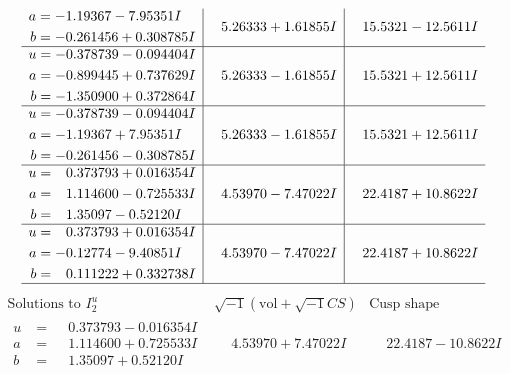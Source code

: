 \documentclass[1p]{elsarticle_modified}
\theoremstyle{definition}
\newcommand{\I}{\sqrt{-1}}
\begin{document}
$$\begin{array}{c|c|c}
\begin{aligned}
a &= -1.19367 - 7.95351 I \\
b &= -0.261456 + 0.308785 I\end{aligned}
 & \phantom{-}5.26333 + 1.61855 I & \phantom{-}15.5321 - 12.5611 I \\ \hline\begin{aligned}
u &= -0.378739 - 0.094404 I \\
a &= -0.899445 + 0.737629 I \\
b &= -1.350900 + 0.372864 I\end{aligned}
 & \phantom{-}5.26333 - 1.61855 I & \phantom{-}15.5321 + 12.5611 I \\ \hline\begin{aligned}
u &= -0.378739 - 0.094404 I \\
a &= -1.19367 + 7.95351 I \\
b &= -0.261456 - 0.308785 I\end{aligned}
 & \phantom{-}5.26333 - 1.61855 I & \phantom{-}15.5321 + 12.5611 I \\ \hline\begin{aligned}
u &= \phantom{-}0.373793 + 0.016354 I \\
a &= \phantom{-}1.114600 - 0.725533 I \\
b &= \phantom{-}1.35097 - 0.52120 I\end{aligned}
 & \phantom{-}4.53970 - 7.47022 I & \phantom{-}22.4187 + 10.8622 I \\ \hline\begin{aligned}
u &= \phantom{-}0.373793 + 0.016354 I \\
a &= -0.12774 - 9.40851 I \\
b &= \phantom{-}0.111222 + 0.332738 I\end{aligned}
 & \phantom{-}4.53970 - 7.47022 I & \phantom{-}22.4187 + 10.8622 I\\
 \hline 
 \end{array}$$\newpage$$\begin{array}{c|c|c}  
\text{Solutions to }I^u_{2}& \I (\text{vol} + \sqrt{-1}CS) & \text{Cusp shape}\\
 \hline 
\begin{aligned}
u &= \phantom{-}0.373793 - 0.016354 I \\
a &= \phantom{-}1.114600 + 0.725533 I \\
b &= \phantom{-}1.35097 + 0.52120 I\end{aligned}
 & \phantom{-}4.53970 + 7.47022 I & \phantom{-}22.4187 - 10.8622 I \\ \hline\begin{aligned}

\end{aligned}
\end{array}$$
\end{document}
